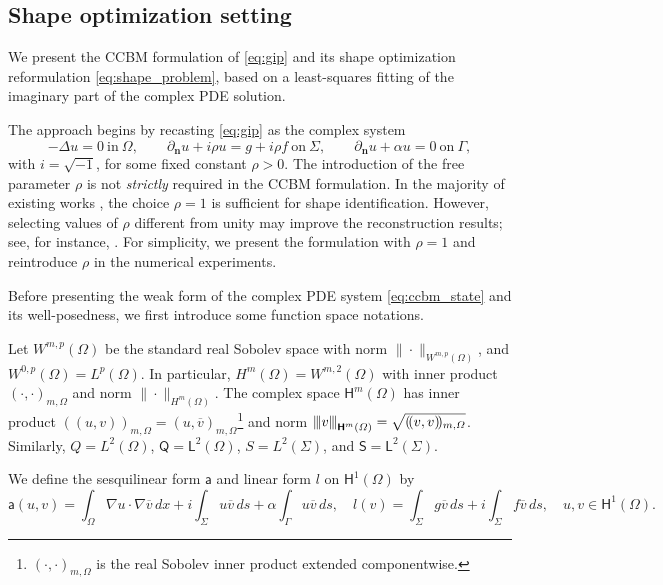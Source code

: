 \documentclass[a4paper,11pt]{article}
\newcommand{\vect}[1]{\boldsymbol{\mathbf{#1}}}
\newcommand{\vertiii}[1]{{\left\vert\kern-0.25ex\left\vert\kern-0.25ex\left\vert #1 
    \right\vert\kern-0.25ex\right\vert\kern-0.25ex\right\vert}}
\newcommand{\aaa}{{\mathsf{a}}}
\newcommand{\LL}{\vect{\mathsf{L}}}
\newcommand{\QQ}{\vect{\mathsf{Q}}}
\newcommand{\SSig}{\vect{\mathsf{S}}}
\newcommand{\HH}{\vect{\mathsf{H}}}
\newcommand{\nn}{\vect{n}}
\newcommand{\intO}[1]{\int_{\varOmega}{#1}{\, {d}{x}}}
\newcommand{\intS}[1]{\int_{\varSigma}{#1}{\, {d}{s}}}
\newcommand{\intG}[1]{\int_{\varGamma}{#1}{\, {d}{s}}}
\begin{document}
\subsection{Shape optimization setting}
\label{subsec:shape_optimization_formulation}
We present the CCBM formulation of \eqref{eq:gip} and its shape optimization reformulation \eqref{eq:shape_problem}, based on a least-squares fitting of the imaginary part of the complex PDE solution.

The approach begins by recasting \eqref{eq:gip} as the complex system
\begin{equation}
\label{eq:ccbm_state}
	-\Delta u = 0 \ \text{in} \ \varOmega, \qquad
	\partial_{\nn} u + i {\rho} u = g + i  {\rho}  f \ \text{on} \ \varSigma, \qquad
	\partial_{\nn} u + \alpha u = 0 \ \text{on} \ \varGamma,
\end{equation}
with $i = \sqrt{-1}$, for some fixed constant ${\rho} > 0$.
The introduction of the free parameter ${\rho}$ is not \textit{strictly} required in the CCBM formulation. 
In the majority of existing works \cite{Rabago2023b,RabagoNotsu2024,RabagoAfraitesNotsu2025,Rabago2025,CherratAfraitesRabago2026}, the choice ${\rho} = 1$ is sufficient for shape identification. 
However, selecting values of ${\rho}$ different from unity may improve the reconstruction results; see, for instance, \cite{AfraitesHadriHriziRabago2026}.
For simplicity, we present the formulation with ${\rho} = 1$ and reintroduce ${\rho}$ in the numerical experiments.

Before presenting the weak form of the complex PDE system \eqref{eq:ccbm_state} and its well-posedness, we first introduce some function space notations.  

Let $W^{m,p}(\varOmega)$ be the standard real Sobolev space with norm $\|\cdot\|_{W^{m,p}(\varOmega)}$, and $W^{0,p}(\varOmega) = L^p(\varOmega)$. In particular, $H^m(\varOmega) = W^{m,2}(\varOmega)$ with inner product $(\cdot,\cdot)_{m,\varOmega}$ and norm $\|\cdot\|_{H^m(\varOmega)}$.  
The complex space $\HH^m(\varOmega)$ has inner product $(\!(u,v)\!)_{m,\varOmega} = (u,\overline{v})_{m,\varOmega}$\footnote{$(\cdot,\cdot)_{m,\varOmega}$ is the real Sobolev inner product extended componentwise.} and norm $\vertiii{v}_{\HH^m(\varOmega)} = \sqrt{(\!(v,v)\!)_{m,\varOmega}}$. Similarly, $Q = L^2(\varOmega)$, $\QQ = \LL^2(\varOmega)$, $S = L^2(\varSigma)$, and $\SSig = \LL^2(\varSigma)$.

%
We define the sesquilinear form $\aaa$ and linear form $l$ on $\HH^{1}(\varOmega)$ by
\[
\aaa(u,v) = \intO{\nabla u \cdot \nabla \overline{v}} + i \intS{u \overline{v}} + \alpha \intG{u \overline{v}}, \quad 
l(v) = \intS{g \overline{v}} + i \intS{f \overline{v}}, \quad u,v \in \HH^1(\varOmega).
\]
\end{document}
